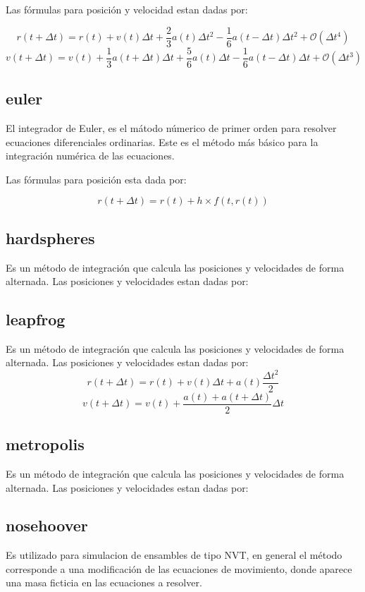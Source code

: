 Las f\'ormulas para posici\'on y velocidad estan dadas por:

$$r(t+\Delta t) = r(t) + v(t)\Delta t + \frac{2}{3}a(t)\Delta t^2 -
\frac{1}{6}a(t-\Delta t)\Delta t^2 +\mathcal{O}(\Delta t^4)$$
$$v(t+\Delta t) = v(t) + \frac{1}{3}a(t+\Delta t)\Delta t+\frac{5}{6}a(t)\Delta
t-\frac{1}{6}a(t-\Delta t)\Delta t+\mathcal{O}(\Delta t^3)$$

\subsection{euler}
El integrador de Euler, es el m\'atodo n\'umerico de primer orden para resolver
ecuaciones diferenciales ordinarias. Este es el m\'etodo m\'as b\'asico para la
integraci\'on num\'erica de las ecuaciones.

Las f\'ormulas para posici\'on esta dada por:

$$r(t+\Delta t) = r(t) + h\times f(t,r(t))$$

\subsection{hardspheres}
Es un m\'etodo de integraci\'on que calcula las posiciones y velocidades de
forma alternada. Las posiciones y velocidades estan dadas por:

\subsection{leapfrog}
Es un m\'etodo de integraci\'on que calcula las posiciones y velocidades de
forma alternada. Las posiciones y velocidades estan dadas por:
$$r(t+\Delta t) = r(t) + v(t)\Delta t + a(t)\frac{\Delta t^2}{2}$$
$$v(t+\Delta t) = v(t) + \frac{a(t)+a(t+\Delta t)}{2}\Delta t$$

\subsection{metropolis}
Es un m\'etodo de integraci\'on que calcula las posiciones y velocidades de
forma alternada. Las posiciones y velocidades estan dadas por:

\subsection{nosehoover}
Es utilizado para simulacion de ensambles de tipo NVT, en general el m\'etodo
corresponde a una modificaci\'on de las ecuaciones de movimiento, donde aparece
una masa ficticia en las ecuaciones a resolver.

